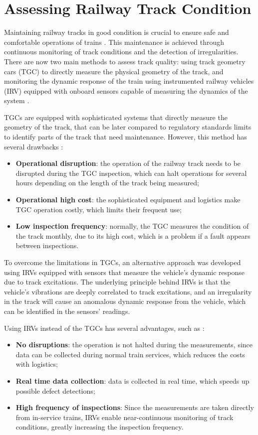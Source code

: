\section{Assessing Railway Track Condition} \label{sec-assessing-railway-track}

Maintaining railway tracks in good condition is crucial to ensure safe and comfortable operations of trains \cite{Tsunashima-2019}. This maintenance is achieved through continuous monitoring of track conditions and the detection of irregularities. There are now two main methods to assess track quality: using track geometry cars (TGC) to directly measure the physical geometry of the track, and monitoring the dynamic response of the train using instrumented railway vehicles (IRV) equipped with onboard sensors capable of measuring the dynamics of the system \cite{PIRES2024107191}.

TGCs are equipped with sophisticated systems that directly measure the geometry of the track, that can be later compared to regulatory standards limits to identify parts of the track that need maintenance. However, this method has several drawbacks \cite{GHIASI2025109516}:
\begin{itemize}
    \item \textbf{Operational disruption}: the operation of the railway track needs to be disrupted during the TGC inspection, which can halt operations for several hours depending on the length of the track being measured;
    \item \textbf{Operational high cost}: the sophisticated equipment and logistics make TGC operation costly, which limits their frequent use;
    \item \textbf{Low inspection frequency}: normally, the TGC measures the condition of the track monthly, due to its high cost, which is a problem if a fault appears between inspections.
\end{itemize}

To overcome the limitations in TGCs, an alternative approach was developed using IRVs equipped with sensors that measure the vehicle's dynamic response due to track excitations. The underlying principle behind IRVs is that the vehicle's vibrations are deeply correlated to track excitations, and an irregularity in the track will cause an anomalous dynamic response from the vehicle, which can be identified in the sensors' readings.

Using IRVs instead of the TGCs has several advantages, such as \cite{Hironori_ONO202322-00239}:
\begin{itemize}
    \item \textbf{No disruptions}: the operation is not halted during the measurements, since data can be collected during normal train services, which reduces the costs with logistics;
    \item \textbf{Real time data collection}: data is collected in real time, which speeds up possible defect detections;
    \item \textbf{High frequency of inspections}: Since the measurements are taken directly from in-service trains, IRVs enable near-continuous monitoring of track conditions, greatly increasing the inspection frequency.
\end{itemize}


